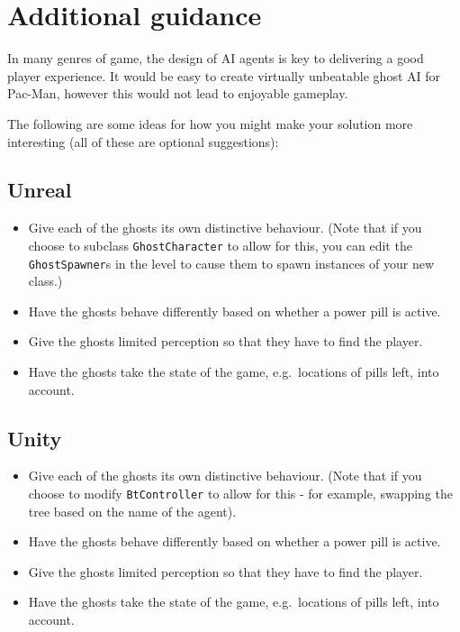 \documentclass{../../../fal_assignment}
\begin{document}
\section*{Additional guidance}

In many genres of game, the design of AI agents is key to delivering a good player experience.
It would be easy to create virtually unbeatable ghost AI for Pac-Man,
however this would not lead to enjoyable gameplay.

The following are some ideas for how you might make your solution more interesting (all of these are optional suggestions):

\subsection*{Unreal}

\begin{itemize}
	\item Give each of the ghosts its own distinctive behaviour. (Note that if you choose to subclass \texttt{GhostCharacter} to allow for this,
	you can edit the \texttt{GhostSpawner}s in the level to cause them to spawn instances of your new class.)
	\item Have the ghosts behave differently based on whether a power pill is active.
	\item Give the ghosts limited perception so that they have to find the player.
	\item Have the ghosts take the state of the game, e.g.\ locations of pills left, into account.
\end{itemize}

\subsection*{Unity}

\begin{itemize}
	\item Give each of the ghosts its own distinctive behaviour. (Note that if you choose to modify \texttt{BtController} to allow for this - for example, swapping the tree based on the name of the agent).
	\item Have the ghosts behave differently based on whether a power pill is active.
	\item Give the ghosts limited perception so that they have to find the player.
	\item Have the ghosts take the state of the game, e.g.\ locations of pills left, into account.
\end{itemize}
\end{document}

